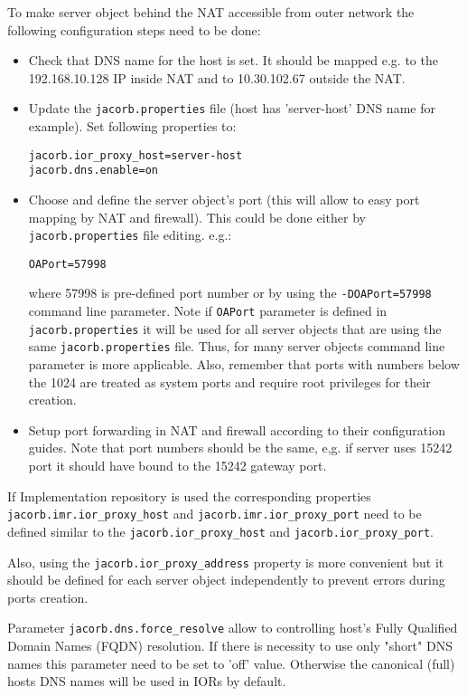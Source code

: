 To make server object behind the NAT accessible from outer network the following configuration steps need to be done:
\begin{itemize}
\item Check that DNS name for the host is set. It should be mapped e.g. to the 192.168.10.128 IP inside NAT and to 10.30.102.67 outside the NAT.
\item Update the {\tt jacorb.properties} file (host has 'server-host' DNS name for example). Set following properties to:
\begin{small}
\begin{verbatim}
jacorb.ior_proxy_host=server-host
jacorb.dns.enable=on
\end{verbatim}
\end{small}
\item Choose and define the server object's port (this will allow to easy port mapping by NAT and firewall). This could be done either by {\tt jacorb.properties} file editing. e.g.:
\begin{small}
\begin{verbatim}
OAPort=57998
\end{verbatim}
\end{small}
where 57998 is pre-defined port number or by using the {\tt -DOAPort=57998} command line parameter.
Note if {\tt OAPort} parameter is defined in {\tt jacorb.properties} it will be used for all server objects that are using the same {\tt jacorb.properties} file.
Thus, for many server objects command line parameter is more applicable.
Also, remember that ports with numbers below the 1024 are treated as system ports and require root privileges for their creation.
\item Setup port forwarding in NAT and firewall according to their configuration guides. Note that port numbers should be the same, e,g. if server uses 15242 port
it should have bound to the 15242 gateway port.
\end{itemize}
If Implementation repository is used the corresponding properties {\tt jacorb.imr.ior\_proxy\_host} and {\tt jacorb.imr.ior\_proxy\_port} need to be defined similar
to the {\tt jacorb.ior\_proxy\_host} and {\tt jacorb.ior\_proxy\_port}.

Also, using the {\tt jacorb.ior\_proxy\_address} property is more convenient but it should be defined for each server object independently to prevent errors during
ports creation.

Parameter {\tt jacorb.dns.force\_resolve} allow to controlling host's Fully Qualified Domain Names (FQDN) resolution. If there is necessity to use only "short" DNS names
this parameter need to be set to 'off' value. Otherwise the canonical (full) hosts DNS names will be used in IORs by default.


